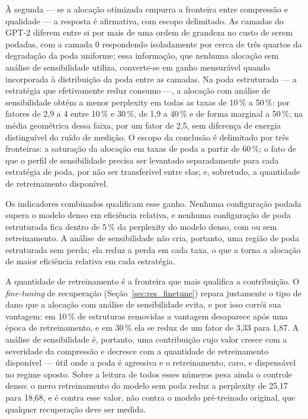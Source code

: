 À segunda --- se a alocação otimizada empurra a fronteira entre compressão e
qualidade --- a resposta é afirmativa, com escopo delimitado. As camadas do
GPT-2 diferem entre si por mais de uma ordem de grandeza no custo de serem
podadas, com a camada 0 respondendo isoladamente por cerca de três quartos da
degradação da poda uniforme; essa informação, que nenhuma alocação sem análise de
sensibilidade utiliza, converte-se em ganho mensurável quando incorporada à distribuição
da poda entre as camadas. Na poda estruturada --- a estratégia que efetivamente reduz
consumo ---, a alocação com análise de sensibilidade obtém a menor perplexity em todas as
taxas de 10\,\% a 50\,\%: por fatores de 2,9 a 4 entre 10\,\% e 30\,\%, de 1,9 a 40\,\% e
de forma marginal a 50\,\%; na média geométrica dessa faixa, por um fator de 2,5, sem
diferença de energia distinguível do ruído de medição. O escopo da conclusão é delimitado
por três fronteiras: a saturação da alocação em taxas de poda a partir de 60\,\%; o fato de
que o perfil de sensibilidade precisa ser levantado separadamente para cada estratégia de
poda, por não ser transferível entre elas; e, sobretudo, a quantidade de
retreinamento disponível.

Os indicadores combinados qualificam esse ganho. Nenhuma configuração podada supera o
modelo denso em eficiência relativa, e nenhuma configuração de poda estruturada fica
dentro de 5\,\% da perplexity do modelo denso, com ou sem retreinamento. A análise de
sensibilidade não cria, portanto, uma região de poda estruturada sem perda; ela reduz a
perda em cada taxa, o que a torna a alocação de maior eficiência relativa em cada
estratégia.

A quantidade de retreinamento é a fronteira que mais qualifica a contribuição. O
\textit{fine-tuning} de recuperação (Seção~\ref{sec:res_finetune}) repara justamente o
tipo de dano que a alocação com análise de sensibilidade evita, e por isso corrói sua
vantagem: em 10\,\% de estruturas removidas a vantagem desaparece após uma época de
retreinamento, e em 30\,\% ela se reduz de um fator de 3,33 para 1,87. A análise de
sensibilidade é, portanto, uma contribuição cujo valor cresce com a severidade
da compressão e decresce com a quantidade de retreinamento disponível --- útil
onde a poda é agressiva e o retreinamento, caro, e dispensável no regime
oposto. Sobre a leitura de todos esses números pesa ainda o controle denso: o
mero retreinamento do modelo sem poda reduz a perplexity de 25,17 para 18,68,
e é contra esse valor, não contra o modelo pré-treinado original, que qualquer
recuperação deve ser medida.
